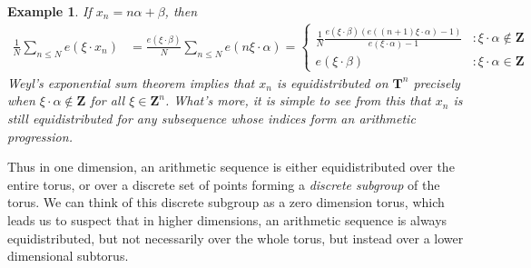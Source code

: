 \documentclass{report}
\theoremstyle{plain}
\newtheorem*{example}{Example}
\theoremstyle{plain}
\begin{document}
\begin{example}
    If $x_n = n \alpha + \beta$, then
    \begin{align*}
        \frac{1}{N} \sum_{n \leq N} e(\xi \cdot x_n) &= \frac{e(\xi \cdot \beta)}{N} \sum_{n \leq N} e(n \xi \cdot \alpha) = \begin{cases} \frac{1}{N} \frac{e(\xi \cdot \beta)(e((n+1) \xi \cdot \alpha) - 1)}{e(\xi \cdot \alpha) - 1} & : \xi \cdot \alpha \not \in \mathbf{Z} \\ e(\xi \cdot \beta) & : \xi \cdot \alpha \in \mathbf{Z} \end{cases}
    \end{align*}
    Weyl's exponential sum theorem implies that $x_n$ is equidistributed on $\mathbf{T}^n$ precisely when $\xi \cdot \alpha \not \in \mathbf{Z}$ for all $\xi \in \mathbf{Z}^n$. What's more, it is simple to see from this that $x_n$ is still equidistributed for any subsequence whose indices form an arithmetic progression.
\end{example}

Thus in one dimension, an arithmetic sequence is either equidistributed over the entire torus, or over a discrete set of points forming a {\it discrete subgroup} of the torus. We can think of this discrete subgroup as a zero dimension torus, which leads us to suspect that in higher dimensions, an arithmetic sequence is always equidistributed, but not necessarily over the whole torus, but instead over a lower dimensional subtorus.
\end{document}
